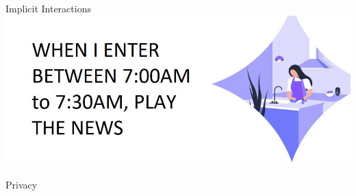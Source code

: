 \documentclass[10pt]{beamer}
\begin{document}

\begin{frame}{Implicit Interactions}
	\includegraphics[width=\textwidth]{images/roomme/6.jpg}
\end{frame}


{
\begin{frame}{Privacy}
\end{frame}
}

\end{document}
